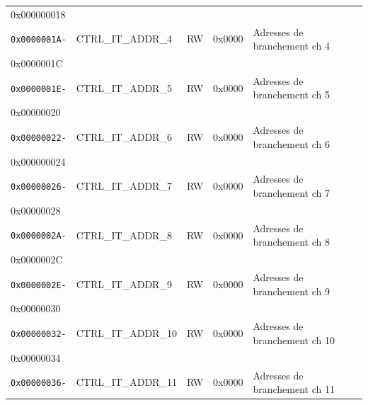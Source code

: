 \begin{table}[H]
\begin{tabular}{llllll}
		{0x000000018}        &                        &               &                &                                      \\
		\rhline
		\texttt{0x0000001A-} & CTRL\_IT\_ADDR\_4      & RW            & 0x0000         & Adresses de branchement ch 4         \\
		{0x0000001C}         &                        &               &                &                                      \\
		\rhline
		\texttt{0x0000001E-} & CTRL\_IT\_ADDR\_5      & RW            & 0x0000         & Adresses de branchement ch 5         \\
		{0x00000020}         &                        &               &                &                                      \\
		\rhline
		\texttt{0x00000022-} & CTRL\_IT\_ADDR\_6      & RW            & 0x0000         & Adresses de branchement ch 6         \\
		{0x000000024}        &                        &               &                &                                      \\
		\rhline
		\texttt{0x00000026-} & CTRL\_IT\_ADDR\_7      & RW            & 0x0000         & Adresses de branchement ch 7         \\
		{0x00000028}         &                        &               &                &                                      \\
		\rhline
		\texttt{0x0000002A-} & CTRL\_IT\_ADDR\_8      & RW            & 0x0000         & Adresses de branchement ch 8         \\
		{0x0000002C}         &                        &               &                &                                      \\
		\rhline
		\texttt{0x0000002E-} & CTRL\_IT\_ADDR\_9      & RW            & 0x0000         & Adresses de branchement ch 9         \\
		{0x00000030}         &                        &               &                &                                      \\
		\rhline
		\texttt{0x00000032-} & CTRL\_IT\_ADDR\_10     & RW            & 0x0000         & Adresses de branchement ch 10        \\
		{0x00000034}         &                        &               &                &                                      \\
		\rhline
		\texttt{0x00000036-} & CTRL\_IT\_ADDR\_11     & RW            & 0x0000         & Adresses de branchement ch 11        \\

\end{tabular}
\end{table}
